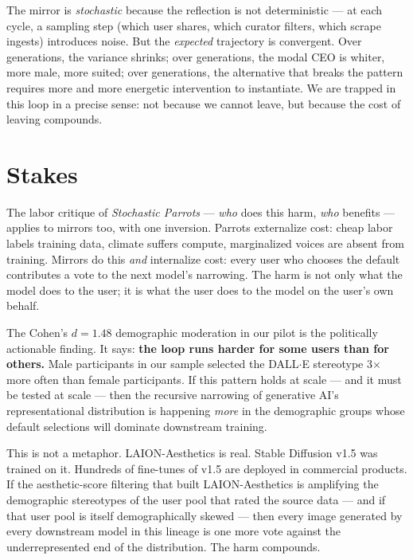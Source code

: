 \documentclass[sigconf,nonacm]{acmart}
\begin{document}
The mirror is \emph{stochastic} because the reflection is not deterministic --- at each cycle, a sampling step (which user shares, which curator filters, which scrape ingests) introduces noise. But the \emph{expected} trajectory is convergent. Over generations, the variance shrinks; over generations, the modal CEO is whiter, more male, more suited; over generations, the alternative that breaks the pattern requires more and more energetic intervention to instantiate. We are trapped in this loop in a precise sense: not because we cannot leave, but because the cost of leaving compounds.

\section{Stakes}

The labor critique of \emph{Stochastic Parrots} --- \emph{who} does this harm, \emph{who} benefits --- applies to mirrors too, with one inversion. Parrots externalize cost: cheap labor labels training data, climate suffers compute, marginalized voices are absent from training. Mirrors do this \emph{and} internalize cost: every user who chooses the default contributes a vote to the next model's narrowing. The harm is not only what the model does to the user; it is what the user does to the model on the user's own behalf.

The Cohen's \(d = 1.48\) demographic moderation in our pilot is the politically actionable finding. It says: \textbf{the loop runs harder for some users than for others.} Male participants in our sample selected the DALL$\cdot$E stereotype 3$\times$ more often than female participants. If this pattern holds at scale --- and it must be tested at scale --- then the recursive narrowing of generative AI's representational distribution is happening \emph{more} in the demographic groups whose default selections will dominate downstream training.

This is not a metaphor. LAION-Aesthetics is real. Stable Diffusion v1.5 was trained on it. Hundreds of fine-tunes of v1.5 are deployed in commercial products. If the aesthetic-score filtering that built LAION-Aesthetics is amplifying the demographic stereotypes of the user pool that rated the source data --- and if that user pool is itself demographically skewed --- then every image generated by every downstream model in this lineage is one more vote against the underrepresented end of the distribution. The harm compounds.
\end{document}
